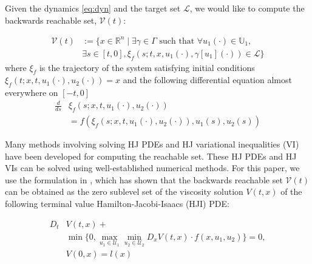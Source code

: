 Given the dynamics \eqref{eq:dyn} and the target set $\mathcal{L}$, we would like to compute the backwards reachable set, $\mathcal{V}(t)$:

\begin{equation}
\begin{aligned}
\mathcal{V}(t) &:= \{x\in\mathbb{R}^n \mid \exists \gamma\in\Gamma \text{ such that } \forall u_1(\cdot)\in\mathbb{U}_1, \\
&\exists s \in [t,0], \xi_f(s; t, x, u_1(\cdot), \gamma[u_1](\cdot)) \in \mathcal{L} \}
\end{aligned}
\end{equation}
where $\xi_f$ is the trajectory of the system satisfying initial conditions $\xi_f(t; x, t, u_1(\cdot), u_2(\cdot))=x$ and the following differential equation almost everywhere on $[-t, 0]$
\begin{equation}
\begin{aligned}
\frac{d}{ds}&\xi_f(s; x, t, u_1(\cdot), u_2(\cdot)) \\
&= f(\xi_f(s; x, t, u_1(\cdot), u_2(\cdot)), u_1(s), u_2(s))
\end{aligned}
\end{equation}

Many methods involving solving HJ PDEs \cite{Mitchell05} and HJ variational inequalities (VI) \cite{Bokanowski10,Barron89,Fisac15} have been developed for computing the reachable set. These HJ PDEs and HJ VIs can be solved using well-established numerical methods. For this paper, we use the formulation in \cite{Mitchell05}, which has shown that the backwards reachable set $\mathcal{V}(t)$ can be obtained as the zero sublevel set of the viscosity solution \cite{Crandall84} $V(t,x)$ of the following terminal value Hamilton-Jacobi-Isaacs (HJI) PDE:

\begin{equation} \label{eq:HJIPDE}
\begin{aligned}
D_t &V(t,x) + \\
&\min \{0, \max_{u_1\in\mathcal{U}_1} \min_{u_2\in\mathcal{U}_2} D_x V(t,x) \cdot f(x,u_1,u_2) \} = 0, \\
&V(0,x) = l(x)
\end{aligned}
\end{equation}

